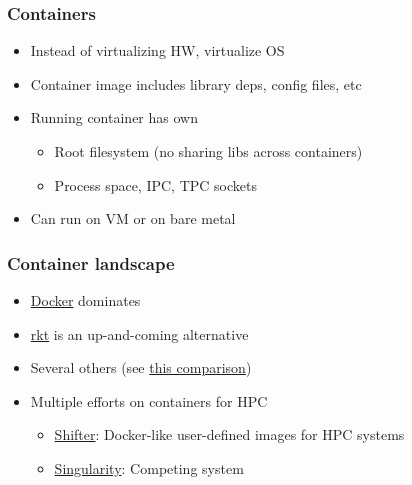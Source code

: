 \documentclass{beamer}
\begin{document}
\begin{frame}
  \frametitle{Containers}

  \begin{itemize}
  \item Instead of virtualizing HW, virtualize OS
  \item Container image includes library deps, config files, etc
  \item Running container has own
    \begin{itemize}
    \item Root filesystem (no sharing libs across containers)
    \item Process space, IPC, TPC sockets
    \end{itemize}
  \item Can run on VM or on bare metal
  \end{itemize}
\end{frame}


\begin{frame}
  \frametitle{Container landscape}

  \begin{itemize}
  \item \href{https://www.docker.com/}{Docker} dominates
  \item \href{https://coreos.com/rkt/}{rkt} is an up-and-coming alternative
  \item Several others (see
    \href{https://coreos.com/rkt/docs/latest/rkt-vs-other-projects.html}{this
      comparison})
  \item Multiple efforts on containers for HPC
    \begin{itemize}
    \item \href{https://www.nersc.gov/research-and-development/user-defined-images/}{Shifter}: Docker-like user-defined images for HPC systems
    \item \href{http://singularity.lbl.gov/}{Singularity}: Competing system
    \end{itemize}
  \end{itemize}
\end{frame}
\end{document}
